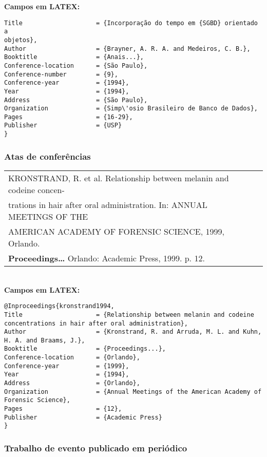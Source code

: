 \textbf{Campos em LATEX:} 
	
\begingroup
\fontsize{10pt}{12pt}\selectfont
\begin{verbatim}
Title                    = {Incorporação do tempo em {SGBD} orientado a 
objetos},
Author                   = {Brayner, A. R. A. and Medeiros, C. B.},
Booktitle                = {Anais...},
Conference-location      = {São Paulo},
Conference-number        = {9},
Conference-year          = {1994},
Year                     = {1994},
Address                  = {São Paulo},
Organization             = {Simp\'osio Brasileiro de Banco de Dados},
Pages                    = {16-29},
Publisher                = {USP}
}
\end{verbatim}
\endgroup
	
\subsubsection{Atas de conferências}
	
\begin{tabular}{|l|c|} \hline
	KRONSTRAND, R. et al. Relationship between melanin and codeine 
	concen-                                                        \\trations in hair after oral administration. In: ANNUAL MEETINGS OF THE \\AMERICAN  ACADEMY OF FORENSIC SCIENCE, 1999, Orlando. \\\textbf{Proceedings…} Orlando:  Academic Press, 1999. p. 12.   \\\hline
\end{tabular} \\
	
\textbf{Campos em LATEX:} 
	
\begingroup
\fontsize{10pt}{12pt}\selectfont
\begin{verbatim}
@Inproceedings{kronstrand1994,
Title                    = {Relationship between melanin and codeine
concentrations in hair after oral administration},
Author                   = {Kronstrand, R. and Arruda, M. L. and Kuhn, 
H. A. and Braams, J.},
Booktitle                = {Proceedings...},
Conference-location      = {Orlando},
Conference-year          = {1999},
Year                     = {1994},
Address                  = {Orlando},
Organization             = {Annual Meetings of the American Academy of 
Forensic Science},
Pages                    = {12},
Publisher                = {Academic Press}
}
\end{verbatim}
\endgroup
\subsubsection{Trabalho de evento publicado em periódico} 
	
